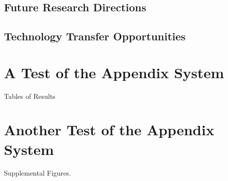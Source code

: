 \documentclass{erauthesis}
\begin{document}
\section{Future Research Directions}

\section{Technology Transfer Opportunities}





% 


\backmatter

\chapter{A Test of the Appendix System}

Tables of Results

\chapter{Another Test of the Appendix System}
Supplemental Figures.
\end{document}
